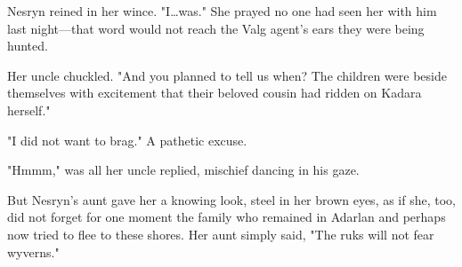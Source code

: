 Nesryn reined in her wince.
"I\ldots was."
She prayed no one had seen her with him last night---that word would not reach the Valg agent's ears they were being hunted.

Her uncle chuckled.
"And you planned to tell us when?
The children were beside themselves with excitement that their beloved cousin had ridden on Kadara herself."

"I did not want to brag."
A pathetic excuse.

"Hmmm," was all her uncle replied, mischief dancing in his gaze.

But Nesryn's aunt gave her a knowing look, steel in her brown eyes, as if she, too, did not forget for one moment the family who remained in Adarlan and perhaps now tried to flee to these shores.
Her aunt simply said, "The ruks will not fear wyverns."

